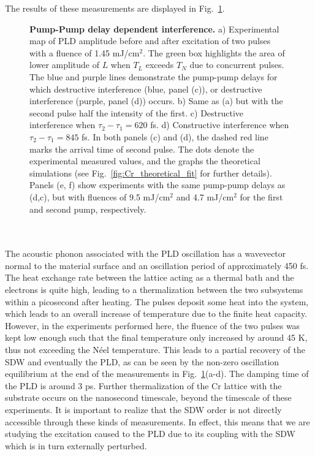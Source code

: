 The results of these measurements are displayed in Fig.~\ref{fig:Cr_experimental}.
\begin{figure}[h]
	\centering
{}
\caption{\label{fig:Cr_experimental}{\bf Pump-Pump delay dependent interference.} a) Experimental map of PLD amplitude before and after excitation of two pulses with a fluence of 1.45 mJ/cm$^2$. The green box highlights the area of lower amplitude of $L$ when $T_L$ exceeds $T_N$ due to concurrent pulses. The blue and purple lines demonstrate the pump-pump delays for which destructive interference (blue, panel (c)), or destructive interference (purple, panel (d)) occurs. b) Same as (a) but with the second pulse half the intensity of the first.  c) Destructive interference when $\tau_2 - \tau_1 = 620$ fs. d) Constructive interference when $\tau_2 - \tau_1 = 845$ fs. In both panels (c) and (d), the dashed red line marks the arrival time of second pulse. The dots denote the experimental measured values, and the graphs the theoretical simulations (see Fig.~\ref{fig:Cr_theoretical_fit} for further details). Panels (e, f) show experiments with the same pump-pump delays as (d,c), but with fluences of 9.5 mJ/cm$^2$ and 4.7 mJ/cm$^2$ for the first and second pump, respectively.}
\end{figure}
\\\\
The acoustic phonon associated with the PLD oscillation has a wavevector normal to the material surface and an oscillation period of approximately 450 fs.
The heat exchange rate between the lattice acting as a thermal bath and the electrons is quite high, leading to a thermalization between the two subsystems within a picosecond after heating.
The pulses deposit some heat into the system, which leads to an overall increase of temperature due to the finite heat capacity.
However, in the experiments performed here, the fluence of the two pulses was kept low enough such that the final temperature only increased by around 45 K, thus not exceeding the N\'eel temperature.
This leads to a partial recovery of the SDW and eventually the PLD, as can be seen by the non-zero oscillation equilibrium at the end of the measurements in Fig.~\ref{fig:Cr_experimental}(a-d).
The damping time of the PLD is around 3 ps.
Further thermalization of the Cr lattice with the substrate occurs on the nanosecond timescale, beyond the timescale of these experiments.
It is important to realize that the SDW order is not directly accessible through these kinds of measurements. In effect, this means that we are studying the excitation caused to the PLD due to its coupling with the SDW which is in turn externally perturbed.
